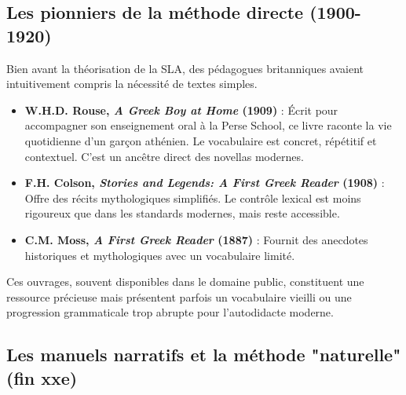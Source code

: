 \subsection{Les pionniers de la méthode directe (1900-1920)}

Bien avant la théorisation de la SLA, des pédagogues britanniques avaient intuitivement compris la
nécessité de textes simples.

\begin{itemize}\item \textbf{W.H.D. Rouse, \textit{A Greek Boy at Home} (1909)} : Écrit pour accompagner son enseignement oral à la Perse School, ce livre raconte la vie quotidienne d'un garçon athénien. Le vocabulaire est concret, répétitif et contextuel.\cite{III-3-2-ref27} C'est un ancêtre direct des novellas modernes.\item \textbf{F.H. Colson, \textit{Stories and Legends: A First Greek Reader} (1908)} : Offre des récits mythologiques simplifiés. Le contrôle lexical est moins rigoureux que dans les standards modernes, mais reste accessible.\cite{III-3-2-ref30}\item \textbf{C.M. Moss, \textit{A First Greek Reader} (1887)} : Fournit des anecdotes historiques et mythologiques avec un vocabulaire limité.\cite{III-3-2-ref31}\end{itemize}Ces ouvrages, souvent disponibles dans le domaine public, constituent une ressource précieuse mais
présentent parfois un vocabulaire vieilli ou une progression grammaticale trop abrupte pour
l'autodidacte moderne.\cite{III-3-2-ref29}



\subsection{Les manuels narratifs et la méthode "naturelle" (fin xxe)}

